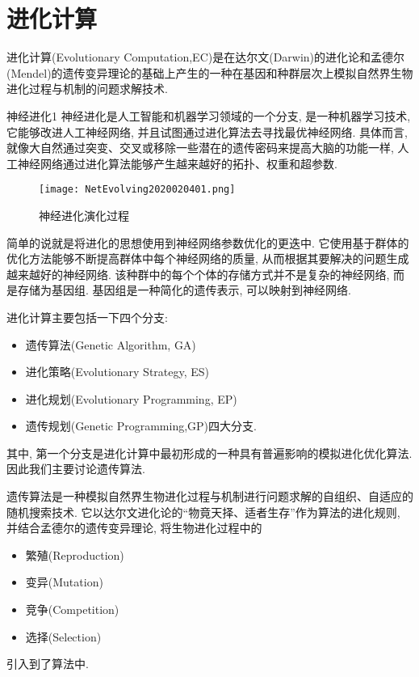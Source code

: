 \section{进化计算}
进化计算(Evolutionary Computation,EC)是在达尔文(Darwin)的进化论和孟德尔(Mendel)的遗传变异理论的基础上产生的一种在基因和种群层次上模拟自然界生物进化过程与机制的问题求解技术.
\begin{mydef}{神经进化}{1}
    神经进化是人工智能和机器学习领域的一个分支, 是一种机器学习技术, 它能够改进人工神经网络, 并且试图通过进化算法去寻找最优神经网络.
    具体而言, 就像大自然通过突变、交叉或移除一些潜在的遗传密码来提高大脑的功能一样, 人工神经网络通过进化算法能够产生越来越好的拓扑、权重和超参数.
\end{mydef}
\begin{figure}[H]
\centering
\texttt{[image: NetEvolving2020020401.png]}
\caption{神经进化演化过程}
\label{NetEvolving2020020401}
\end{figure}
简单的说就是将进化的思想使用到神经网络参数优化的更迭中.
它使用基于群体的优化方法能够不断提高群体中每个神经网络的质量, 从而根据其要解决的问题生成越来越好的神经网络.
该种群中的每个个体的存储方式并不是复杂的神经网络, 而是存储为基因组. 基因组是一种简化的遗传表示, 可以映射到神经网络.

进化计算主要包括一下四个分支:
\begin{itemize}
\item 遗传算法(Genetic Algorithm, GA)
\item 进化策略(Evolutionary Strategy, ES)
\item 进化规划(Evolutionary Programming, EP)
\item 遗传规划(Genetic Programming,GP)四大分支.
\end{itemize}
其中, 第一个分支是进化计算中最初形成的一种具有普遍影响的模拟进化优化算法. 因此我们主要讨论遗传算法.

遗传算法是一种模拟自然界生物进化过程与机制进行问题求解的自组织、自适应的随机搜索技术. 它以达尔文进化论的“物竟天择、适者生存”作为算法的进化规则, 并结合孟德尔的遗传变异理论, 将生物进化过程中的
\begin{itemize}
\item 繁殖(Reproduction)
\item 变异(Mutation)
\item 竞争(Competition)
\item 选择(Selection)
\end{itemize}
引入到了算法中.

